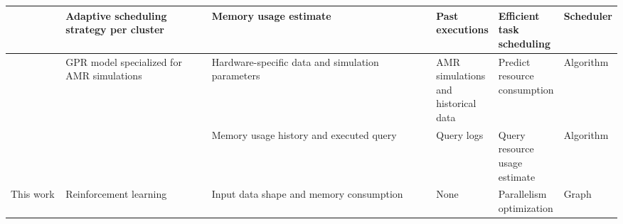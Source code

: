 \begin{table}[ht]
{\begin{tabular}{@{}|p{0.11\linewidth}|p{0.3\linewidth}|p{0.5\linewidth}|p{0.3\linewidth}|p{0.3\linewidth}|p{0.2\linewidth}|@{}}
      \cite{goponenko2020} & Adaptive scheduling strategy per cluster                      & Memory usage estimate                                                                                   & Past executions                                 & Efficient task scheduling      & Scheduler            \\ \midrule
      \cite{duplyakin2018} & \ac{GPR} model specialized for \ac{AMR} simulations           & Hardware-specific data and simulation parameters                                                        & \ac{AMR} simulations and historical data        & Predict resource consumption   & Algorithm            \\ \midrule
      \cite{tang2021}      &                                      & Memory usage history and executed query                      & Query logs                               & Query resource usage estimate  & Algorithm            \\ \midrule
      This work            & Reinforcement learning                                        & Input data shape and memory consumption                                                                 & None                                            & Parallelism optimization       & Graph                \\ \midrule
    \end{tabular}
  }
\end{table}
